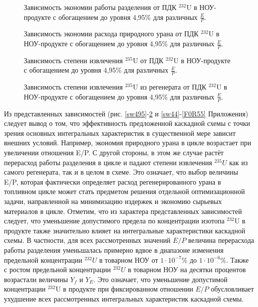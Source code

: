 \begin{figure}[ht]
    \centering
    \begin{minipage}{.5\textwidth}
      \centering
      
\caption{{Зависимость экономии работы разделения от ПДК $^{232}$U в НОУ-продукте с обогащением до уровня 4,95\% для различных $\frac{E}{P}$.{\label{sw495}}}}
    \end{minipage}%
    \begin{minipage}{.5\textwidth}
      \centering
      
    \caption{{Зависимость экономии расхода природного урана от ПДК $^{232}$U в НОУ-продукте с обогащением до уровня 4,95\% для различных $\frac{E}{P}$.{\label{F0R495}}}}
\end{minipage}
\end{figure}


\begin{figure}[ht]
    \centering
    \begin{minipage}{.5\textwidth}
      \centering
      
      \caption{{Зависимость степени извлечения $^{235}$U от ПДК $^{232}$U в НОУ-продукте с обогащением до уровня 4,95\% для различных $\frac{E}{P}$.{\label{ex495}}}}
    \end{minipage}%
    \begin{minipage}{.5\textwidth}
      \centering
      
      \caption{{Зависимость степени извлечения $^{235}$U из регенерата от ПДК $^{232}$U в НОУ-продукте с обогащением до уровня 4,95\% для различных $\frac{E}{P}$.{\label{exR495}}}}
\end{minipage}
\end{figure}


Из представленных зависимостей (рис. \ref{sw495}-\ref{exR495} и \ref{sw44}-\ref{F0R55} Приложения) следует вывод о том, что эффективность предложенной каскадной схемы с точки зрения основных интегральных характеристик в существенной мере зависит внешних условий. Например, экономия природного урана в цикле возрастает при увеличении отношения E/P. С другой стороны, в этом же случае растёт перерасход работы разделения в цикле и падают степени извлечения $^{235}U$ как из самого регенерата, так и в целом в схеме. Это означает, что выбор величины E/P, которая фактически определяет расход регенерированного урана в топливном цикле может стать предметом решения отдельной оптимизационной задачи, направленной на минимизацию издержек и экономию сырьевых материалов в цикле. 
Отметим, что из характера представленных зависимостей следует, что уменьшение допустимого предела по концентрации изотопа $^{232}$U в продукте также значительно влияет на интегральные характеристики каскадной схемы. В частности, для всех рассмотренных значений $E/P$ величина перерасхода работы разделения уменьшалась примерно вдвое в диапазоне изменения предельной концентрации $^{232}U$ в товарном НОУ от $1\cdot10^{-7}$\% до $1\cdot10^{-6}$\%. Также с ростом предельной концентрации $^{232}U$ в товарном НОУ на десятки процентов возрастали величины $Y_f$ и $Y_{E}$. Это означает, что уменьшение допустимой концентрации $^{232}$U в продукте при фиксированном отношении $E/P$ обусловливает ухудшение всех рассмотренных интегральных характеристик каскадной схемы. 

